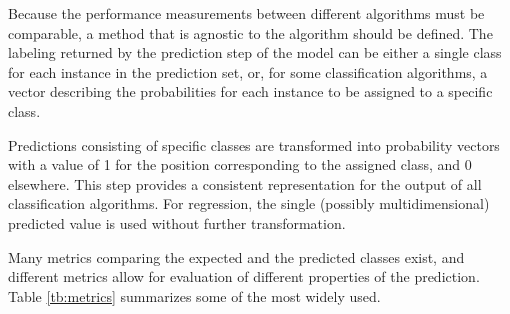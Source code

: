 	Because the performance measurements between different algorithms must be comparable, a method
	that is agnostic to the algorithm should be defined. The labeling returned by the prediction
	step of the model can be either a single class for each instance in the prediction set,
	or, for some classification algorithms, a vector describing the probabilities for each instance
	to be assigned to a specific class.
	
	Predictions consisting of specific classes are transformed into probability vectors with a value
	of 1 for the position corresponding to the assigned class, and 0 elsewhere. This step provides a
	consistent representation for the output of all classification algorithms. For regression, the
	single (possibly multidimensional) predicted value is used without further transformation.

	Many metrics comparing the expected and the predicted classes exist, and different metrics
	allow for evaluation of different properties of the prediction. Table \ref{tb:metrics}
	summarizes some of the most widely used.

